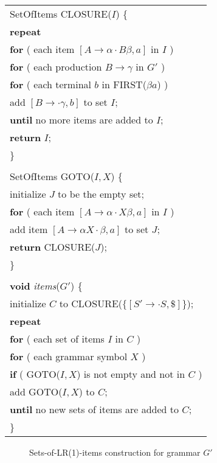 \documentclass[12pt,a4paper,twoside,openany]{book}
\begin{document}
\begin{center}
    \begin{tabular}{l}
        SetOfItems CLOSURE($I$) \{\\
        \qquad\textbf{repeat}\\
        \qquad\qquad\textbf{for} ( each item $[A\rightarrow\alpha\cdot B\beta,a]$ in $I$ )\\
        \qquad\qquad\qquad\textbf{for} ( each production $B\rightarrow\gamma$ in $G'$ )\\
        \qquad\qquad\qquad\qquad\textbf{for} ( each terminal $b$ in FIRST($\beta a$) )\\
        \qquad\qquad\qquad\qquad\qquad add $[B\rightarrow\cdot\gamma,b]$ to set $I$;\\
        \qquad\textbf{until} no more items are added to $I$;\\
        \qquad\textbf{return} $I$;\\
        \}\\
        \\
        SetOfItems GOTO($I,X$) \{\\
        \qquad initialize $J$ to be the empty set;\\
        \qquad\textbf{for} ( each item $[A\rightarrow\alpha\cdot X\beta,a]$ in $I$ )\\
        \qquad\qquad add item $[A\rightarrow\alpha X\cdot\beta,a]$ to set $J$;\\
        \qquad\textbf{return} CLOSURE($J$);\\
        \}\\
        \\
        \textbf{void} \textit{items}($G'$) \{\\
        \qquad initialize $C$ to CLOSURE($\{[S'\rightarrow\cdot S,\mathdollar]\}$);\\
        \qquad\textbf{repeat}\\
        \qquad\qquad\textbf{for} ( each set of items $I$ in $C$ )\\
        \qquad\qquad\qquad\textbf{for} ( each grammar symbol $X$ )\\
        \qquad\qquad\qquad\qquad\textbf{if} ( GOTO($I,X$) is not empty and not in $C$ )\\
        \qquad\qquad\qquad\qquad\qquad add GOTO($I,X$) to $C$;\\
        \qquad\textbf{until} no new sets of items are added to $C$;\\
        \}
    \end{tabular}
\end{center}
\begin{figure}[htbp]
    \caption{Sets-of-LR(1)-items construction for grammar $G'$}
    \label{Figure:4.40}
\end{figure}
\end{document}
